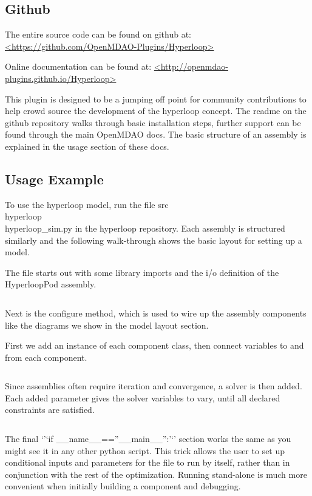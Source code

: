 \documentclass[heading.tex]{subfiles}
\begin{document}
 \label{app:2}  

\subsection{Github}

The entire source code can be found on github at:
\url{<https://github.com/OpenMDAO-Plugins/Hyperloop>}

Online documentation can be found at:
\url{<http://openmdao-plugins.github.io/Hyperloop>}

This plugin is designed to be a jumping off point for community contributions to help crowd source the development of the hyperloop
concept. The readme on the github repository walks through basic installation steps, further support can be found through the main
OpenMDAO docs. The basic structure of an assembly is explained in the usage section of these docs.

\subsection{Usage Example}

To use the hyperloop model, run the file src\\hyperloop\\hyperloop\_sim.py in the hyperloop repository. 
Each assembly is structured similarly and the following walk-through shows the basic layout for setting up a model.

The file starts out with some library imports and the i/o definition of the HyperloopPod assembly.

\inputminted[fontsize=\tiny]{python}{code/example1.py}

Next is the configure method, which is used to wire up the assembly components like the diagrams we show in the model layout section.

First we add an instance of each component class, then connect variables to and from each component.

\inputminted[fontsize=\tiny]{python}{code/example2.py}
 
 Since assemblies often require iteration and convergence, a solver is then added. Each added parameter gives the solver variables to vary, until all declared constraints are satisfied.
\inputminted[fontsize=\tiny]{python}{code/example3.py}
The final ‘’‘if \_\_name\_\_==”\_\_main\_\_”:’‘’ section works the same as you might see it in any other python script. This trick allows the user to set up conditional inputs and parameters for the file to run by itself, rather than in conjunction with the rest of the optimization. Running stand-alone is much more convenient when initially building a component and debugging. 

\inputminted[fontsize=\tiny]{python}{code/example4.py} %
\end{document}
